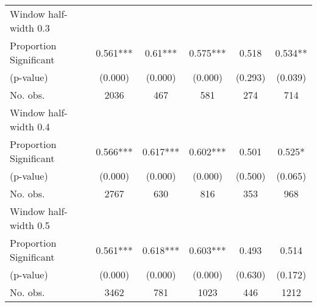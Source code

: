 \begin{tabular}{l*{5}{c}}
\hline
Window half-width 0.3\\

Proportion Significant& 0.561*** &  0.61*** &  0.575*** &  0.518 &  0.534**\\

(p-value) & (0.000) &  (0.000) &  (0.000) &  (0.293) &  (0.039)\\

No. obs.& 2036 &  467 &  581 &  274 &  714\\

\hline
Window half-width 0.4\\

Proportion Significant& 0.566*** &  0.617*** &  0.602*** &  0.501 &  0.525*\\

(p-value) & (0.000) &  (0.000) &  (0.000) &  (0.500) &  (0.065)\\

No. obs.& 2767 &  630 &  816 &  353 &  968\\

\hline
Window half-width 0.5\\

Proportion Significant& 0.561*** &  0.618*** &  0.603*** &  0.493 &  0.514\\

(p-value) & (0.000) &  (0.000) &  (0.000) &  (0.630) &  (0.172)\\

No. obs.& 3462 &  781 &  1023 &  446 &  1212\\

\hline\hline
\end{tabular}

